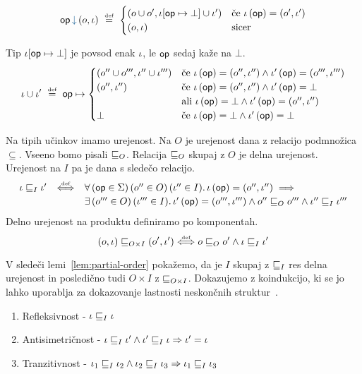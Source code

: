 $$\opincomp{op}{(\o, \i)}~\defeq~
\begin{cases}
	\left(\o \cup \o' , \i[\op \mapsto \bot] \cup \i' \right) & \mbox{če } \i\, (\op) = (\o',\i')\\
	(\o,\i) & \mbox{sicer} 
\end{cases}$$

Tip $\iota[\mathsf{op} \mapsto \bot]$ je povsod enak $\iota$, le $\mathsf{op}$ sedaj kaže na $\bot$.
$$
\iota \cup \iota'
~\mathrel{\overset{\text{\tiny def}}{=}}~
\mathsf{op} \mapsto 
\begin{cases}
	(o'' \cup o''' , \iota'' \cup \iota''') & \mbox{če } \iota\, (\mathsf{op}) = (o'',\iota'') \wedge \iota'\, (\mathsf{op}) = (o''',\iota''') \\
	(o'' , \iota'') & \mbox{če } \iota\, (\mathsf{op}) = (o'',\iota'') \wedge \iota'\, (\mathsf{op}) = \bot \\
	              & \mbox{ali } \iota\, (\mathsf{op}) = \bot \wedge \iota'\, (\mathsf{op}) = (o'',\iota'') \\
	\bot & \mbox{če } \iota\, (\mathsf{op}) = \bot \wedge \iota'\, (\mathsf{op}) = \bot \\
\end{cases}
$$

Na tipih učinkov imamo urejenost. Na $O$ je urejenost dana z relacijo podmnožica $\subseteq$. Vseeno bomo pisali $\sqsubseteq_{O}$. Relacija $\sqsubseteq_{O}$ skupaj z $O$ je delna urejenost.
Urejenost na $I$ pa je dana s sledečo relacijo.
$$
\begin{array}{l c l}
	\iota \sqsubseteq_{I} \iota'
	&
	\mathrel{\overset{\text{\tiny def}}{\Longleftrightarrow}}
	&
	\forall\, (\mathsf{op} \in \Sigma) \, (o'' \in O) \, (\iota'' \in I) .\, \iota\, (\mathsf{op}) = ({o''} , {\iota''}) \implies 
	\\[0.5ex]
	&& \exists\, (o''' \in O) \, (\iota''' \in I) .\, \iota'\, (\mathsf{op}) = ({o'''} , {\iota'''}) \wedge o'' \sqsubseteq_{O} o''' \wedge \iota'' \sqsubseteq_{I} \iota'''
\end{array}
$$
Delno urejenost na produktu definiramo po komponentah.
$$(o, \iota) \sqsubseteq_{O \times I} (o', \iota') \mathrel{\overset{\text{\tiny def}}{\Longleftrightarrow}} o \sqsubseteq_{O} o' \wedge \iota \sqsubseteq_{I} \iota'$$

V sledeči lemi~\ref{lem:partial-order} pokažemo, da je $I$ skupaj z $\sqsubseteq_{I}$ res delna urejenost in posledično tudi $O \times I$ z $\sqsubseteq_{O \times I}$.
Dokazujemo z koindukcijo, ki se jo lahko uporablja za dokazovanje lastnosti neskončnih struktur~\cite{coinduction}. 

\begin{lema}\label{lem:partial-order}
	\begin{enumerate}
		\item Refleksivnost - $\iota \sqsubseteq_{I} \iota$
		\item Antisimetričnost - $\iota \sqsubseteq_{I} \iota' \wedge \iota' \sqsubseteq_{I} \iota \Rightarrow \iota' = \iota$
		\item Tranzitivnost - $\iota_1 \sqsubseteq_{I} \iota_2 \wedge \iota_2 \sqsubseteq_{I} \iota_3 \Rightarrow \iota_1 \sqsubseteq_{I} \iota_3$
	\end{enumerate}
\end{lema}

